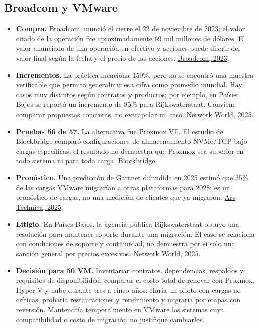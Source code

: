 \subsection{Broadcom y VMware}
\begin{itemize}
\item \textbf{Compra.} Broadcom anunció el cierre el 22 de noviembre de 2023; el valor citado de la operación fue aproximadamente 69 mil millones de dólares. El valor anunciado de una operación en efectivo y acciones puede diferir del valor final según la fecha y el precio de las acciones. \href{https://investors.broadcom.com/news-releases/news-release-details/broadcom-completes-acquisition-vmware}{Broadcom, 2023}.
\item \textbf{Incrementos.} La práctica menciona 150\%, pero no se encontró una muestra verificable que permita generalizar esa cifra como promedio mundial. Hay casos muy distintos según contratos y productos; por ejemplo, en Países Bajos se reportó un incremento de 85\% para Rijkswaterstaat. Conviene comparar propuestas concretas, no extrapolar un caso. \href{https://www.networkworld.com/article/4015489/dutch-court-forces-broadcom-to-support-vmware-migration-after-85-price-hike-backlash.html}{Network World, 2025}.
\item \textbf{Pruebas 56 de 57.} La alternativa fue Proxmox VE. El estudio de Blockbridge comparó configuraciones de almacenamiento NVMe/TCP bajo cargas específicas; el resultado no demuestra que Proxmox sea superior en todo sistema ni para toda carga. \href{https://kb.blockbridge.com/technote/proxmox-vs-vmware-nvmetcp/}{Blockbridge}.
\item \textbf{Pronóstico.} Una predicción de Gartner difundida en 2025 estimó que 35\% de las cargas VMware migrarían a otras plataformas para 2028; es un pronóstico de cargas, no una medición de clientes que ya migraron. \href{https://arstechnica.com/information-technology/2025/09/35-percent-of-vmware-workloads-expected-to-migrate-elsewhere-by-2028/}{Ars Technica, 2025}.
\item \textbf{Litigio.} En Países Bajos, la agencia pública Rijkswaterstaat obtuvo una resolución para mantener soporte durante una migración. El caso se relaciona con condiciones de soporte y continuidad, no demuestra por sí solo una sanción general por precios excesivos. \href{https://www.networkworld.com/article/4015489/dutch-court-forces-broadcom-to-support-vmware-migration-after-85-price-hike-backlash.html}{Network World, 2025}.
\item \textbf{Decisión para 50 VM.} Inventariar contratos, dependencias, respaldos y requisitos de disponibilidad; comparar el costo total de renovar con Proxmox, Hyper-V y nube durante tres a cinco años. Haría un piloto con cargas no críticas, probaría restauraciones y rendimiento y migraría por etapas con reversión. Mantendría temporalmente en VMware los sistemas cuya compatibilidad o costo de migración no justifique cambiarlos.
\end{itemize}

